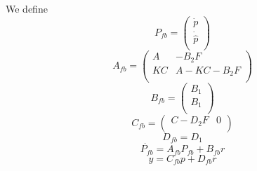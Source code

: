 \documentclass{article}
\newenvironment{answer}[2][Answer]{\begin{trivlist}
  \item[\hskip \labelsep {\bfseries #1}\hskip \labelsep {\bfseries #2:}]}{\end{trivlist}}
\begin{document}
\begin{answer}k
  We define 
  $$P_{fb} = \left(\begin{array}{c} \dot{p} \\ \dot{\hat{p}} \\  \end{array}\right)$$ 
  $$A_{fb} = \left(\begin{array}{cc} A & -B_2F \\ KC & A - KC - B_2F \\ \end{array} \right)$$
  $$B_{fb} = \left(\begin{array}{c} B_1\\B_1\\ \end{array} \right)$$
  $$C_{fb} = \left(\begin{array}{cc} C - D_2F & 0 \\ \end{array} \right)$$
  $$D_{fb} = D_1$$
  $$\dot{P_{fb}} = A_{fb}P_{fb} + B_{fb}r$$ 
  $$ y = C_{fb}p + D_{fb}r $$

\end{answer}
\end{document}

